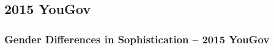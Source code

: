 \subsection{2015 YouGov}

\begin{frame} %
\frametitle{Gender Differences in Sophistication -- 2015 YouGov}
  \begin{figure}
  \end{figure}
\end{frame}



